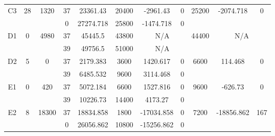 \begin{sidewaystable}
\begin{tabular}{c||c|c||c|c|c|c|c||c|c|c}
         &
        
      \\
      \hline
      \multirow{2}{*}{C3} &
      \multirow{2}{*}{28} &
      \multirow{2}{*}{1320} &
      37 &
      23361.43 &
      20400 &
        -2961.43 &
        0 &
      \multirow{2}{*}{25200} &
        \multirow{2}{*}{-2074.718} &
        \multirow{2}{*}{0}
      \\
      \cline{4-8}
       &
       &
       &
      0 &
      27274.718 &
      25800 &
        -1474.718 &
        0 &
      
         &
        
      \\
      \hline
      \multirow{2}{*}{D1} &
      \multirow{2}{*}{0} &
      \multirow{2}{*}{4980} &
      37 &
      45445.5 &
      43800 &
        \multicolumn{2}{|c||}{N/A} &
      \multirow{2}{*}{44400} &
        \multicolumn{2}{c}{\multirow{2}{*}{N/A}}
      \\
      \cline{4-8}
       &
       &
       &
      39 &
      49756.5 &
      51000 &
        \multicolumn{2}{|c||}{N/A} &
      
        
      \\
      \hline
      \multirow{2}{*}{D2} &
      \multirow{2}{*}{5} &
      \multirow{2}{*}{0} &
      37 &
      2179.383 &
      3600 &
        1420.617 &
        0 &
      \multirow{2}{*}{6600} &
        \multirow{2}{*}{114.468} &
        \multirow{2}{*}{0}
      \\
      \cline{4-8}
       &
       &
       &
      39 &
      6485.532 &
      9600 &
        3114.468 &
        0 &
      
         &
        
      \\
      \hline
      \multirow{2}{*}{E1} &
      \multirow{2}{*}{0} &
      \multirow{2}{*}{420} &
      37 &
      5072.184 &
      6600 &
        1527.816 &
        0 &
      \multirow{2}{*}{9600} &
        \multirow{2}{*}{-626.73} &
        \multirow{2}{*}{0}
      \\
      \cline{4-8}
       &
       &
       &
      39 &
      10226.73 &
      14400 &
        4173.27 &
        0 &
      
         &
        
      \\
      \hline
      \multirow{2}{*}{E2} &
      \multirow{2}{*}{8} &
      \multirow{2}{*}{18300} &
      37 &
      18834.858 &
      1800 &
        -17034.858 &
        0 &
      \multirow{2}{*}{7200} &
        \multirow{2}{*}{-18856.862} &
        \multirow{2}{*}{167}
      \\
      \cline{4-8}
       &
       &
       &
      0 &
      26056.862 &
      10800 &
        -15256.862 &
        0 &
      

\end{tabular}
\end{sidewaystable}
